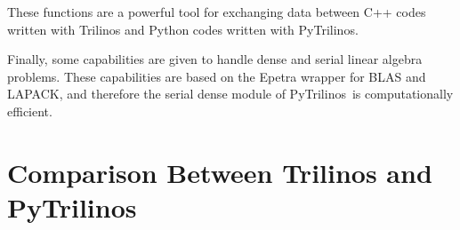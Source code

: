 \documentclass[10pt,relax]{SANDreport}
\newcommand{\PyTrilinos}{{PyTrilinos}}
\begin{document}
These functions are a powerful tool for exchanging data between C++
codes written with Trilinos and Python codes written with \PyTrilinos.

Finally, some capabilities are given to handle dense and serial linear
algebra problems.  These capabilities are based on the Epetra wrapper
for BLAS and LAPACK, and therefore the serial dense module of
\PyTrilinos\ is computationally efficient.

\section{Comparison Between Trilinos and PyTrilinos}
\label{sec:comp}
\end{document}
